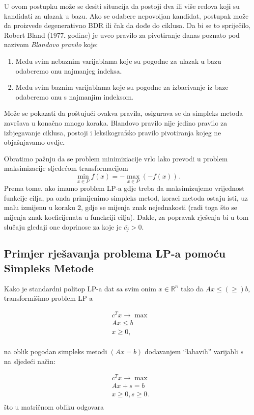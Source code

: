 \documentclass[a4paper, utf8, 11pt, colorlinks]{article}
\begin{document}
U ovom postupku  može se desiti situacija da postoji dva ili više redova koji su kandidati za ulazak u bazu. Ako se odabere nepovoljan kandidat, postupak može da proizvede degenerativno BDR ili čak da dođe do ciklusa. 
Da bi se to spriječilo, Robert Bland (1977. godine) je uveo pravilo za pivotiranje danas poznato pod
nazivom \emph{Blandovo pravilo} koje:
\begin{enumerate}
	\item   Među svim nebaznim varijablama koje su pogodne za ulazak u bazu odaberemo onu najmanjeg indeksa. 
    \item Među svim baznim varijablama koje su pogodne za izbacivanje iz baze odaberemo onu s najmanjim indeksom.
\end{enumerate}
Može se pokazati da poštujući ovakva pravila, osigurava se da simpleks metoda  završava u konačno mnogo koraka. Blandovo pravilo nije jedino pravilo za izbjegavanje ciklusa, postoji i leksikografsko pravilo pivotiranja kojeg ne objašnjavamo ovdje.  

Obratimo pažnju da se problem minimiziacije vrlo lako prevodi u problem maksimizacije sljedećom transformacijom
$$ \min_{ x \in P} f(x) = - \max_{x \in P}(-f(x)).$$ 
Prema tome, ako imamo problem LP-a gdje treba da maksimizujemo vrijednost funkcije cilja, pa onda primijenimo simpleks metod, koraci metoda ostaju isti, uz malu izmijenu u koraku 2, gdje se mijenja znak nejednakosti (radi toga što se mijenja znak koeficijenata u funckciji cilja). Dakle, za popravak rješenja bi u tom slučaju gledaji one doprinose za koje je $\overline{c_j} > 0$.

\subsection{Primjer rješavanja problema LP-a pomoću Simpleks Metode}
Kako je standardni politop LP-a dat sa svim onim $x \in \mathbb{R}^n$ tako da $Ax \leq (\geq) b$, transformišimo problem LP-a
 
  \begin{align}
    & c^T x \rightarrow \max \\
    & Ax \leq b \\
    & x \geq 0,\\
\end{align}
 
na oblik pogodan simpleks metodi $(A {x} = b)$ dodavanjem ``labavih'' varijabli $s$ na sljedeći način:
 
\begin{align}
    & c^T x \rightarrow \max \\
    & Ax + s =  b \\
    & x \geq 0, s \geq 0. \\
\end{align}
što u matričnom obliku odgovara 
\end{document}
